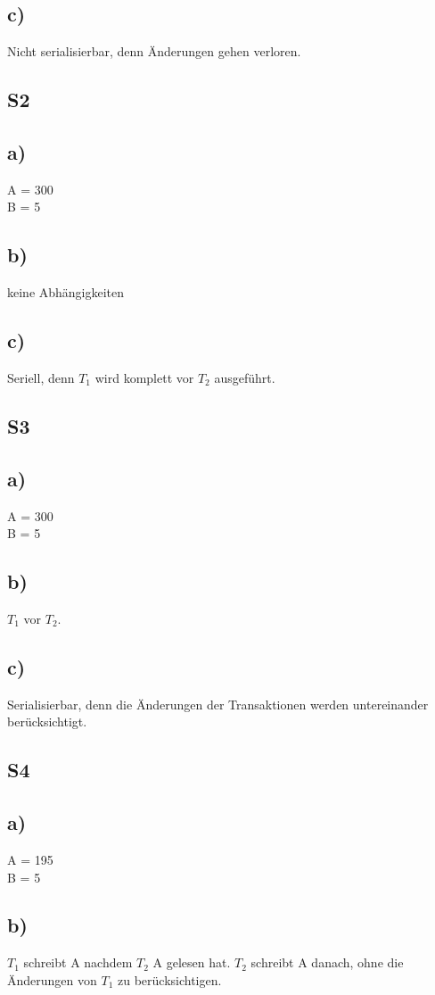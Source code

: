 \documentclass[a4paper,12pt,]{scrartcl}
\begin{document}
\subsection*{c)}
Nicht serialisierbar, denn Änderungen gehen verloren.

\subsection*{S2}
\subsection*{a)}
A = 300 \\
B = 5
\subsection*{b)}
keine Abhängigkeiten
\subsection*{c)}
Seriell, denn \(T_1\) wird komplett vor \(T_2\) ausgeführt.

\subsection*{S3}
\subsection*{a)}
A = 300 \\
B = 5
\subsection*{b)}
\(T_1\) vor \(T_2\). 
\subsection*{c)}
Serialisierbar, denn die Änderungen der Transaktionen werden untereinander berücksichtigt.

\subsection*{S4}
\subsection*{a)}
A = 195 \\
B = 5
\subsection*{b)}
\(T_1\) schreibt A nachdem \(T_2\) A gelesen hat. \(T_2\) schreibt A danach, ohne die Änderungen von \(T_1\) zu berücksichtigen.
\end{document}
